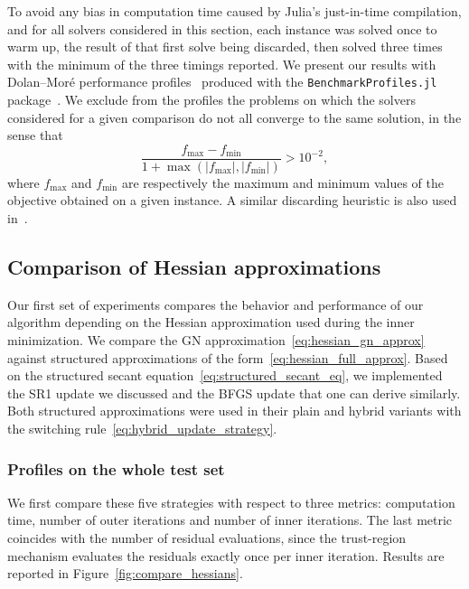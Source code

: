 \documentclass[pdflatex,sn-mathphys-num]{sn-jnl}%
\theoremstyle{thmstyleone}%
\begin{document}
To avoid any bias in computation time caused by Julia's just-in-time compilation, and for all solvers considered in this section, each instance was solved once to warm up, the result of that first solve being discarded, then solved three times with the minimum of the three timings reported. We present our results with Dolan--Mor\'e performance profiles~\cite{dolanmore:2002} produced with the \texttt{BenchmarkProfiles.jl} package~\cite{benchmark-profiles-julia}. We exclude from the profiles the problems on which the solvers considered for a given comparison do not all converge to the same solution, in the sense that
\begin{equation}\label{eq:discarding_heuristic}
	\dfrac{f_{\max} - f_{\min}}{1 + \max \left(|f_{\max}|,|f_{\min}|\right)} > 10^{-2},
\end{equation}
where $f_{\max}$ and $f_{\min}$ are respectively the maximum and minimum values of the objective obtained on a given instance. A similar discarding heuristic is also used in~\cite{wachterbiegler:2006, orbansiqueira:2020}.

\subsection{Comparison of Hessian approximations}\label{subsec:compare_hessians}

Our first set of experiments compares the behavior and performance of our algorithm depending on the Hessian approximation used during the inner minimization. We compare the GN approximation~\eqref{eq:hessian_gn_approx} against structured approximations of the form~\eqref{eq:hessian_full_approx}. Based on the structured secant equation~\eqref{eq:structured_secant_eq}, we implemented the SR1 update we discussed and the BFGS update that one can derive similarly. Both structured approximations were used in their plain and hybrid variants with the switching rule~\eqref{eq:hybrid_update_strategy}.

\subsubsection{Profiles on the whole test set}

We first compare these five strategies with respect to three metrics: computation time, number of outer iterations and number of inner iterations. The last metric coincides with the number of residual evaluations, since the trust-region mechanism evaluates the residuals exactly once per inner iteration. Results are reported in Figure~\ref{fig:compare_hessians}.
\end{document}
